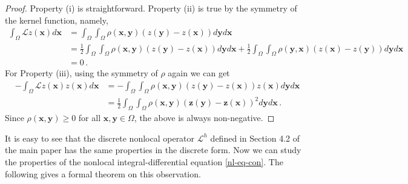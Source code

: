 \documentclass{article}
\newcommand{\xb}{\bm{x}}
\newcommand{\yb}{\bm{y}}
\newcommand{\zb}{\bm{z}}
\begin{document}
\begin{proof}
Property (i) is straightforward. Property (ii) is true by the symmetry of the kernel function, namely,
\[
\begin{aligned}
\int_\Omega\mathcal{L} z(\xb)d\xb&=\int_\Omega\int_\Omega \rho(\xb,\yb)(z(\yb)-z(\xb))d\yb d\xb\\
&=\frac{1}{2}\int_\Omega\int_\Omega \rho(\xb,\yb)(z(\yb)-z(\xb))d\yb d\xb +\frac{1}{2}\int_\Omega\int_\Omega \rho(\yb,\xb)(z(\xb)-z(\yb))d\yb d\xb\\
& = 0\,.
\end{aligned}
\]
For Property (iii), using the symmetry of $\rho$ again we can get
\[
\begin{aligned}
-\int_\Omega \mathcal{L}z(\xb) z(\xb)d\xb &= -\int_\Omega\int_\Omega \rho(\xb,\yb)(z(\yb)-z(\xb))z(\xb)d\yb d\xb \\
&=\frac{1}{2}\int_\Omega\int_\Omega \rho(\xb,\yb)(\zb(\yb)-\zb(\xb))^2 d\yb d\xb\,.
\end{aligned}
\]
Since $\rho(\xb,\yb)\ge 0$ for all $\xb,\yb\in\Omega$, the above is always non-negative.
\end{proof}
It is easy to see that the discrete nonlocal operator $\mathcal{L}^h$ defined in Section 4.2 of the main paper has the same properties in the discrete form. Now we can study the properties of the nonlocal integral-differential equation \eqref{nl-eq-con}. The following gives a formal theorem on this observation.
\end{document}
